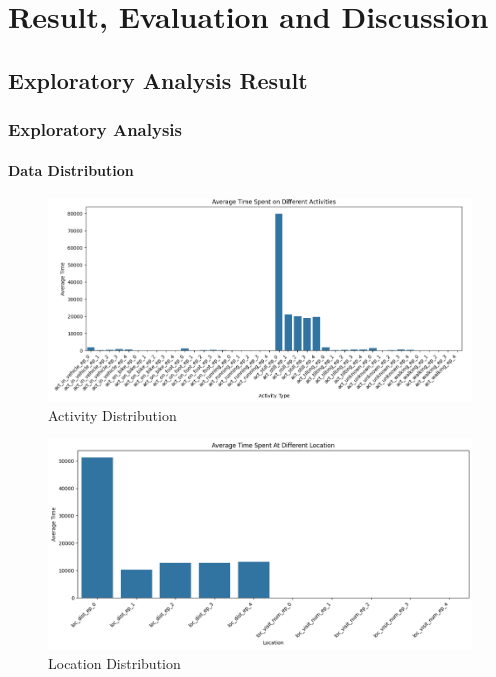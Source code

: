 \def\baselinestretch{1}

\chapter{Result, Evaluation and Discussion}
\section{Exploratory Analysis Result}
\subsection{Exploratory Analysis }
\subsubsection{Data Distribution}
\begin{figure}[H]
    \centering
    \includegraphics[width=0.5\linewidth]{Dissertation 24/activity.png}
    \caption{Activity Distribution}
    \label{fig:activ}
\end{figure}

\begin{figure}[H]
    \centering
    \includegraphics[width=0.5\linewidth]{Dissertation 24/loca.png}
    \caption{Location Distribution}
    \label{fig:loca}
\end{figure}

